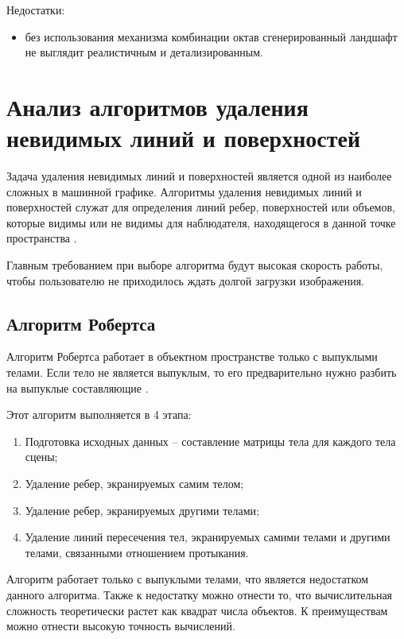 Недостатки:

\begin{itemize}[label=--]
	\item без использования механизма комбинации октав сгенерированный
	ландшафт не выглядит реалистичным и детализированным.
\end{itemize}

\section{Анализ алгоритмов удаления невидимых линий и поверхностей}

Задача удаления невидимых линий и поверхностей является одной из
наиболее сложных в машинной графике. Алгоритмы удаления невидимых линий
и поверхностей служат для определения линий ребер, поверхностей или
объемов, которые видимы или не видимы для наблюдателя, находящегося в 
данной точке пространства \cite{rodjers}.
 
Главным требованием при выборе алгоритма будут высокая скорость
работы, чтобы пользователю не приходилось ждать долгой загрузки
изображения.

\subsection{Алгоритм Робертса}

Алгоритм Робертса работает в объектном пространстве только с
выпуклыми телами. Если тело не является выпуклым, то его предварительно
нужно разбить на выпуклые составляющие \cite{rodjers}.

Этот алгоритм выполняется в 4 этапа:

\begin{enumerate}[label={\arabic*)}]
	\item Подготовка исходных данных – составление матрицы тела для
	каждого тела сцены;
	\item Удаление ребер, экранируемых самим телом;
	\item Удаление ребер, экранируемых другими телами;
	\item Удаление линий пересечения тел, экранируемых самими телами и
	другими телами, связанными отношением протыкания.
\end{enumerate}

Алгоритм работает только с выпуклыми телами, что является недостатком данного алгоритма. Также к недостатку можно отнести то, что вычислительная сложность теоретически растет как квадрат числа объектов. К преимуществам можно отнести высокую точность вычислений.

